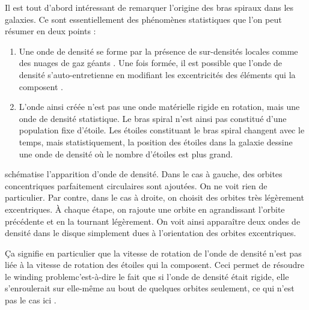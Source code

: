 \bigskip

Il est tout d'abord intéressant de remarquer l'origine des bras spiraux dans les galaxies. Ce sont essentiellement des phénomènes statistiques que l'on peut résumer en deux points : 
\begin{enumerate}
\item Une onde de densité se forme par la présence de sur-densités locales comme des nuages de gaz géants
\citep{donghia2013self}. Une fois formée, il est possible que l'onde de densité s'auto-entretienne en modifiant les
excentricités des éléments qui la composent \citep{binney2008book}.

\item L'onde ainsi créée n'est pas une onde matérielle rigide en rotation, mais une onde de densité statistique. Le bras spiral n'est ainsi pas constitué d'une population fixe d'étoile. Les étoiles constituant le bras spiral changent avec le temps, mais statistiquement, la position des étoiles dans la galaxie dessine une onde de densité où le nombre d'étoiles est plus grand. 
\end{enumerate}

 schématise l'apparition d'onde de densité. Dans le cas à gauche, des orbites concentriques parfaitement
circulaires sont ajoutées. On ne voit rien de particulier. Par contre, dans le cas à droite, on choisit des orbites très
légèrement excentriques. À chaque étape, on rajoute une orbite en agrandissant l'orbite précédente et en la tournant légèrement.
On voit ainsi apparaître deux ondes de densité dans le disque simplement dues à l'orientation des orbites excentriques.

Ça signifie en particulier que la vitesse de rotation de l'onde de densité n'est pas liée à la vitesse de rotation des étoiles qui la composent. Ceci permet de résoudre le \og winding problem\fg c'est-à-dire le fait que si l'onde de densité était rigide, elle s'enroulerait sur elle-même au bout de quelques orbites seulement, ce qui n'est pas le cas ici \citep{binney2008book}.

